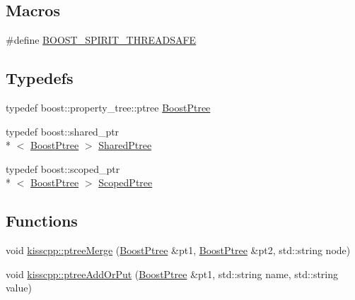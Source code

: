 \subsection*{Macros}
\begin{DoxyCompactItemize}
\item 
\#define \hyperlink{a00048_ab07969225d898805b009f4a619f2450d}{B\-O\-O\-S\-T\-\_\-\-S\-P\-I\-R\-I\-T\-\_\-\-T\-H\-R\-E\-A\-D\-S\-A\-F\-E}
\end{DoxyCompactItemize}
\subsection*{Typedefs}
\begin{DoxyCompactItemize}
\item 
typedef boost\-::property\-\_\-tree\-::ptree \hyperlink{a00048_ab36820650b8e0db36402aea80485633c}{Boost\-Ptree}
\item 
typedef boost\-::shared\-\_\-ptr\\*
$<$ \hyperlink{a00048_ab36820650b8e0db36402aea80485633c}{Boost\-Ptree} $>$ \hyperlink{a00048_a6ae398e86fa933d7157221802015c517}{Shared\-Ptree}
\item 
typedef boost\-::scoped\-\_\-ptr\\*
$<$ \hyperlink{a00048_ab36820650b8e0db36402aea80485633c}{Boost\-Ptree} $>$ \hyperlink{a00048_a06832735f6e8ab6b981a6274310e2c36}{Scoped\-Ptree}
\end{DoxyCompactItemize}
\subsection*{Functions}
\begin{DoxyCompactItemize}
\item 
void \hyperlink{a00089_a36b9e65a0a3786bd85198e4530c65bf9}{kisscpp\-::ptree\-Merge} (\hyperlink{a00048_ab36820650b8e0db36402aea80485633c}{Boost\-Ptree} \&pt1, \hyperlink{a00048_ab36820650b8e0db36402aea80485633c}{Boost\-Ptree} \&pt2, std\-::string node)
\item 
void \hyperlink{a00089_a6bb122f9d1f472c12420a2ec59fdc287}{kisscpp\-::ptree\-Add\-Or\-Put} (\hyperlink{a00048_ab36820650b8e0db36402aea80485633c}{Boost\-Ptree} \&pt1, std\-::string name, std\-::string value)
\end{DoxyCompactItemize}


